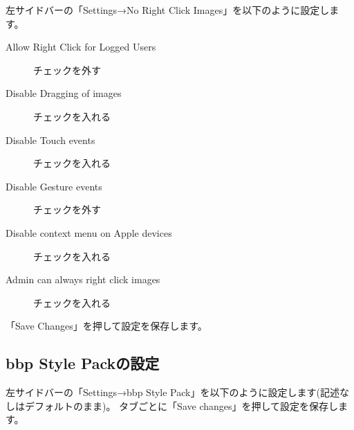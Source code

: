 \documentclass[titlepage,10pt,a4paper,uplatex]{jsbook}
\begin{document}
左サイドバーの「Settings→No Right Click Images」を以下のように設定します。

\begin{description}
\item[Allow Right Click for Logged Users] チェックを外す
\item[Disable Dragging of images] チェックを入れる
\item[Disable Touch events] チェックを入れる
\item[Disable Gesture events] チェックを外す
\item[Disable context menu on Apple devices] チェックを入れる
\item[Admin can always right click images] チェックを入れる
\end{description}

「Save Changes」を押して設定を保存します。

\subsection{bbp Style Packの設定}

左サイドバーの「Settings→bbp Style Pack」を以下のように設定します(記述なしはデフォルトのまま)。
タブごとに「Save changes」を押して設定を保存します。
\end{document}

